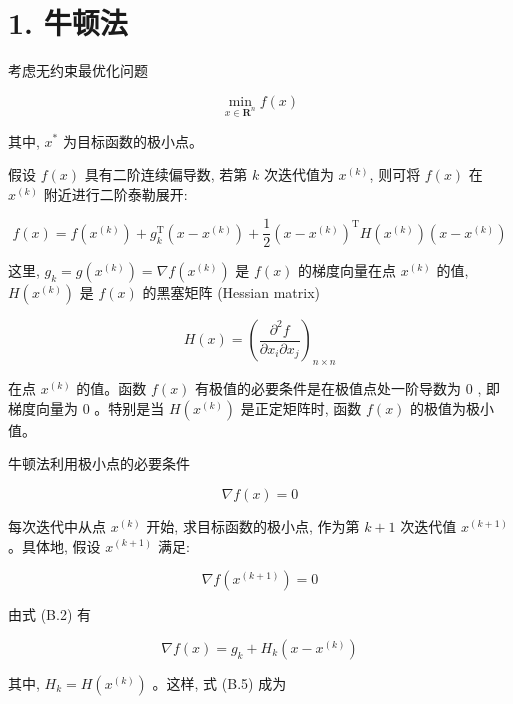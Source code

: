 \documentclass[10pt]{article}
\begin{document}
\section*{1. 牛顿法}
考虑无约束最优化问题


\begin{equation*}
\min _{x \in \boldsymbol{R}^{n}} f(x) \tag{B.1}
\end{equation*}


其中, $x^{*}$ 为目标函数的极小点。

假设 $f(x)$ 具有二阶连续偏导数, 若第 $k$ 次迭代值为 $x^{(k)}$, 则可将 $f(x)$ 在 $x^{(k)}$ 附近进行二阶泰勒展开:


\begin{equation*}
f(x)=f\left(x^{(k)}\right)+g_{k}^{\mathrm{T}}\left(x-x^{(k)}\right)+\frac{1}{2}\left(x-x^{(k)}\right)^{\mathrm{T}} H\left(x^{(k)}\right)\left(x-x^{(k)}\right) \tag{B.2}
\end{equation*}


这里, $g_{k}=g\left(x^{(k)}\right)=\nabla f\left(x^{(k)}\right)$ 是 $f(x)$ 的梯度向量在点 $x^{(k)}$ 的值, $H\left(x^{(k)}\right)$ 是 $f(x)$ 的黑塞矩阵 (Hessian matrix)


\begin{equation*}
H(x)=\left(\frac{\partial^{2} f}{\partial x_{i} \partial x_{j}}\right)_{n \times n} \tag{B.3}
\end{equation*}


在点 $x^{(k)}$ 的值。函数 $f(x)$ 有极值的必要条件是在极值点处一阶导数为 0 , 即梯度向量为 0 。特别是当 $H\left(x^{(k)}\right)$ 是正定矩阵时, 函数 $f(x)$ 的极值为极小值。

牛顿法利用极小点的必要条件


\begin{equation*}
\nabla f(x)=0 \tag{B.4}
\end{equation*}


每次迭代中从点 $x^{(k)}$ 开始, 求目标函数的极小点, 作为第 $k+1$ 次迭代值 $x^{(k+1)}$ 。具体地, 假设 $x^{(k+1)}$ 满足:


\begin{equation*}
\nabla f\left(x^{(k+1)}\right)=0 \tag{B.5}
\end{equation*}


由式 (B.2) 有


\begin{equation*}
\nabla f(x)=g_{k}+H_{k}\left(x-x^{(k)}\right) \tag{B.6}
\end{equation*}


其中, $H_{k}=H\left(x^{(k)}\right)$ 。这样, 式 (B.5) 成为
\end{document}
